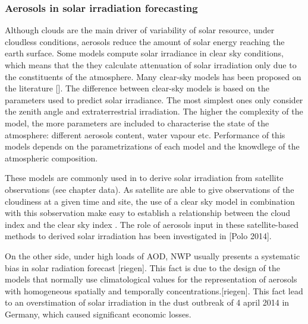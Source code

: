 \subsubsection{Aerosols in solar irradiation forecasting}

Although clouds are the main driver of variability of solar resource, under cloudless conditions, aerosols reduce the amount of solar energy reaching the earth surface. Some models compute solar irradiance in clear sky conditions, which means that the they calculate attenuation of solar irradiation only due to the constituents of the atmosphere. Many clear-sky models has been proposed on the literature []. The difference between clear-sky models is based on the parameters used to predict solar irradiance. The most simplest ones only consider the zenith angle and extraterrestrial irradiation. The higher the complexity of the model, the more parameters are included to characterise the state of the atmosphere: different aerosols content, water vapour etc. Performance of this models depends on the parametrizations of each model and the knowdlege of the atmospheric composition.
 
These models are commonly used in to derive solar irradiation from satellite observations (see chapter data). As satellite are able to give observations of the cloudiness at a given time and site, the use of a clear sky model in combination with this sobservation make easy to establish a relationship between the cloud index and the clear sky index . The role of aerosols input in these satellite-based methods to derived solar irradiation has been investigated in [Polo 2014]. 

On the other side, under high loads of AOD, NWP usually presents a systematic bias in solar radiation forecast [riegen]. This fact is due to the design of the models that normally use climatological values for the representation of aerosols with homogeneous spatially and temporally concentrations.[riegen]. This fact lead to an overstimation of solar irradiation in the dust outbreak of 4 april 2014 in Germany, which caused significant economic losses.


